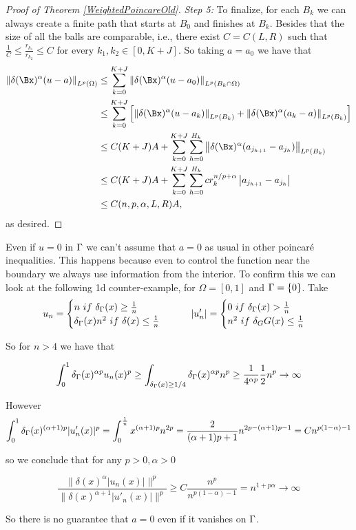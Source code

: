 \begin{proof}[Proof of Theorem \ref{WeightedPoincareOld}]
\textit{Step 5:} To finalize, for each $B_k$ we can always  create a finite path that starts at $B_0$ and finishes at $B_k$. Besides that the size of all the balls are comparable, i.e., there exist $C=C(L,R)$ such that $\frac{1}{C}\leq\frac{r_{k_1}}{r_{k_2}}\leq C$ for every $k_1,k_2\in[0, K+J]$. So taking $a=a_0$ we have that
\begin{align*}
\left\|\delta(\Bx)^\alpha (u-a)\right\|_{L^p(\Omega)} &\leq \sum_{k=0}^{K+J}\left\|\delta(\Bx)^\alpha (u-a_0)\right\|_{L^p(B_k\cap \Omega)}\\
&\leq\sum_{k=0}^{K+J}\left[\left\|\delta(\Bx)^\alpha (u-a_k)\right\|_{L^p(B_k)}+\left\|\delta(\Bx)^\alpha (a_k-a)\right\|_{L^p(B_k)}\right]\\
&\leq C(K+J) A +\sum_{k=0}^{K+J}\sum_{h=0}^{H_k} \left\|\delta(\Bx)^\alpha (a_{j_{h+1}}-a_{j_h 
 }) \right\|_{L^p(B_k)}\\ 
 &\leq C(K+J) A+\sum_{k=0}^{K+J}\sum_{h=0}^{H_k}c r_k^{n/p+\alpha}\left|a_{j_{h+1}}-a_{j_h 
 }\right|\\
 & \leq C(n,p,\alpha,L,R)  A, 
\end{align*}
as desired. 
\end{proof}

\begin{remark} Even if $u=0$ in $\Gamma$ we can't assume that $a=0$ as usual in other poincaré inequalities. This happens because even to control the function near the boundary we always use information from the interior. To confirm this we can look at the following 1d counter-example, for $\Omega =[0,1]$ and $\Gamma=\{0\}$. Take
$$u_n=\begin{cases} n\ if\  \delta_\Gamma(x)\geq \frac{1}{n}\\
\delta_\Gamma(x)n^{2}\  if \  \delta(x)\leq \frac{1}{n} \end{cases}\qquad |u'_n| = \begin{cases} 0\ if\  \delta_\Gamma(x)> \frac{1}{n}\\
n^{2}\  if \  \delta_GG(x)\leq \frac{1}{n} \end{cases}
$$

So for $n>4$ we have that 

$$\int_0^1 \delta_\Gamma(x)^{\alpha p} u_n(x) ^p \geq \int_{\delta_\Gamma(x)\geq 1/4} \delta_\Gamma(x)^{\alpha p}n^p \geq \frac{1}{4^{\alpha p}}\frac{1}{2}n^p\to \infty$$

However $$\int_0^1 \delta_\Gamma(x)^{(\alpha+1) p} |u'_n(x)| ^p = \int_0^{\frac{1}{n}} x^{(\alpha+1)p} n^{2p} =\frac{2}{(\alpha+1)p+1}n^{2p-(\alpha+1)p-1} =C n^{p(1-\alpha )-1} $$


so we conclude that for any $p>0, \alpha>0$ 

$$\frac{\|\delta(x)^\alpha |u_n(x)|\|^p}{\|\delta(x)^{\alpha+1} |u'_n(x)|\|^p}\geq C \frac{n^p}{n^{p(1-\alpha)-1}}=n^{1+p\alpha}  \to \infty$$

So there is no guarantee that $a=0$  even if it vanishes on $\Gamma$.

\end{remark}

